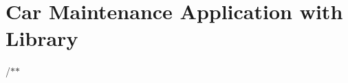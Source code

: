 \chapter{Car Maintenance Application with Library}
\hypertarget{index}{}\label{index}
\label{index_md__r_e_a_d_m_e}%
%
 /\texorpdfstring{$\ast$}{*}\texorpdfstring{$\ast$}{*}
\begin{DoxyItemize}
\item 
\end{DoxyItemize}